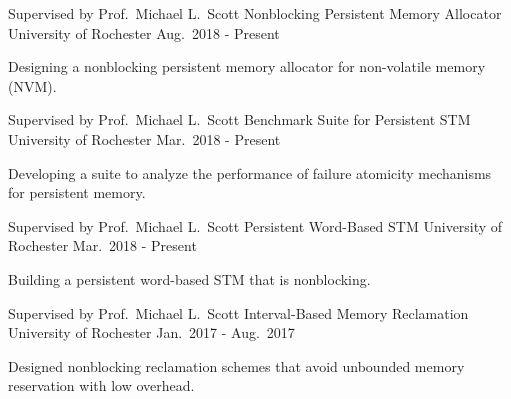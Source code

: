 

\begin{cventries}

  \cventry
    {Supervised by Prof.\ Michael L.\ Scott} %
    {Nonblocking Persistent Memory Allocator} %
    {University of Rochester} %
    {Aug.\ 2018 - Present} %
    {
      \begin{cvitems} %
        \item {Designing a nonblocking persistent memory allocator for non-volatile memory (NVM).}
      \end{cvitems}
	}

  \cventry
    {Supervised by Prof.\ Michael L.\ Scott} %
    {Benchmark Suite for Persistent STM} %
    {University of Rochester} %
    {Mar.\ 2018 - Present} %
    {
      \begin{cvitems} %
        \item {Developing a suite to analyze the performance of failure atomicity mechanisms for persistent memory.}
      \end{cvitems}
    }

  \cventry
    {Supervised by Prof.\ Michael L.\ Scott} %
    {Persistent Word-Based STM} %
    {University of Rochester} %
    {Mar.\ 2018 - Present} %
    {
      \begin{cvitems} %
        \item {Building a persistent word-based STM that is nonblocking.}
      \end{cvitems}
    }

  \cventry
    {Supervised by Prof.\ Michael L.\ Scott} %
    {Interval-Based Memory Reclamation} %
    {University of Rochester} %
    {Jan.\ 2017 - Aug.\ 2017} %
    {
      \begin{cvitems} %
        \item {Designed nonblocking reclamation schemes that avoid unbounded memory reservation with low overhead.}
      \end{cvitems}
    }


\end{cventries}
